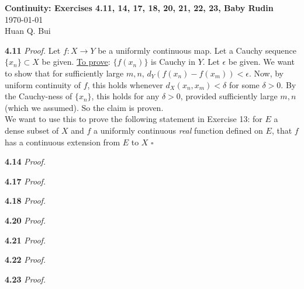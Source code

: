 \documentclass[11pt]{article}
\begin{document}
\begin{center}
{\Large\bf  Continuity:  Exercises 4.11, 14, 17, 18, 20, 21, 22, 23, Baby Rudin}\\
$\,$\\
\today\\
{\Large  Huan Q. Bui}
\end{center}


\noindent \textbf{4.11}
\noindent \textit{Proof.}  Let $f: X \to Y$ be a uniformly continuous map. Let a Cauchy sequence $\{ x_n\} \subset X$ be given. \underline{To prove}: $\{ f(x_n)\}$ is Cauchy in $Y$. Let $\epsilon$ be given. We want to show that for sufficiently large $m,n$, $d_Y (f(x_n) - f(x_m)) < \epsilon$. Now, by uniform continuity of $f$, this holds whenever $d_X(x_n, x_m) < \delta$ for some $\delta > 0$. By the Cauchy-ness of $\{x_n\}$, this holds for any $\delta > 0$, provided sufficiently large $m,n$ (which we assumed). So the claim is proven.\\


We want to use this to prove the following statement in Exercise 13: for $E$ a dense subset of $X$ and $f$ a uniformly continuous \textit{real} function defined on $E$, that $f$ has a continuous extension from $E$ to $X$  \hfill $\square$

\noindent \textbf{4.14} 
\noindent \textit{Proof.}  

\noindent \textbf{4.17}
\noindent \textit{Proof.} 

\noindent \textbf{4.18}
\noindent \textit{Proof.} 

\noindent \textbf{4.20}
\noindent \textit{Proof.} 

\noindent \textbf{4.21}
\noindent \textit{Proof.} 

\noindent \textbf{4.22}
\noindent \textit{Proof.} 

\noindent \textbf{4.23}
\noindent \textit{Proof.} 
\end{document}

